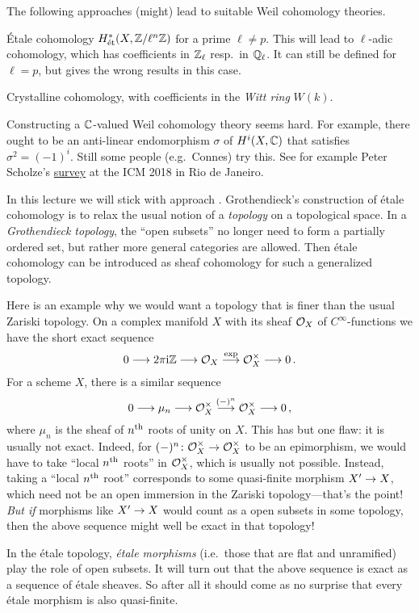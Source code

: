 \documentclass[a4paper, 10pt, oneside, DIV=9, chapterprefix=true, numbers=enddot, bibliography=totoc]{scrbook}
\begin{document}
 The following approaches (might) lead to suitable Weil cohomology theories.
\begin{alphanumerate}
	\item Étale cohomology $H_{\mathrm{\acute{e}t}}^*(X,\mathbb{Z}/\ell^n\mathbb{Z})$ for a prime $\ell\neq p$. This will lead to $\ell$-adic cohomology, which has coefficients in $\mathbb{Z}_\ell$ resp.\ in $\mathbb{Q}_\ell$. It can still be defined for $\ell=p$, but gives the wrong results in this case.
	\item Crystalline cohomology, with coefficients in the \emph{Witt ring} $W(k)$.
	\item Constructing a $\mathbb{C}$-valued Weil cohomology theory seems hard. For example, there ought to be an anti-linear endomorphism $\sigma$ of $H^i(X,\mathbb{C})$ that satisfies $\sigma^2=(-1)^i$. Still some people (e.g.\ Connes) try this. See for example Peter Scholze's \href{http://www.math.uni-bonn.de/people/scholze/Rio.pdf}{survey} at the ICM 2018 in Rio de Janeiro.
\end{alphanumerate}
In this lecture we will stick with approach . Grothendieck's construction of étale cohomology is to relax the usual notion of a \emph{topology} on a topological space. In a \emph{Grothendieck topology}, the \enquote{open subsets} no longer need to form a partially ordered set, but rather more general categories are allowed. Then étale cohomology can be introduced as sheaf cohomology for such a generalized topology.

\begin{exm}
	Here is an example why we would want a topology that is finer than the usual Zariski topology. On a complex manifold $X$ with its sheaf $\mathcal{O}_X$ of $C^\infty$-functions we have the short exact sequence
	\begin{equation*}
		0\morphism 2\pi\mathrm{i}\IZ\morphism\Oo_X\morphism[\exp]\Oo_X^\times\morphism 0\,.
	\end{equation*}
	For a scheme $X$, there is a similar sequence
	\begin{equation*}
		0\morphism\mu_n\morphism\Oo_X^\times\morphism[(-)^n]\Oo_X^\times\morphism 0\,,
	\end{equation*}
	where $\mu_n$ is the sheaf of $n^{\text{th}}$ roots of unity on $X$. This has but one flaw: it is usually not exact. Indeed, for $(-)^n\colon \Oo_X^\times\morphism\Oo_X^\times$ to be an epimorphism, we would have to take \enquote{local $n^{\text{th}}$ roots} in $\mathcal{O}_X^\times$, which is usually not possible. Instead, taking a \enquote{local $n^{\text{th}}$ root} corresponds to some quasi-finite morphism $X'\morphism X$, which need not be an open immersion in the Zariski topology---that's the point! \emph{But if} morphisms like $X'\morphism X$ would count as a open subsets in some topology, then the above sequence might well be exact in that topology!
	
	In the étale topology, \emph{étale morphisms} (i.e.\ those that are flat and unramified) play the role of open subsets. It will turn out that the above sequence is exact as a sequence of étale sheaves. So after all it should come as no surprise that every étale morphism is also quasi-finite.
\end{exm}
\end{document}
